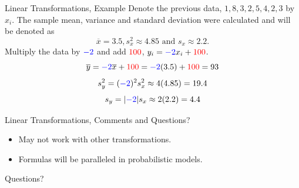 \documentclass{beamer}
\newcommand{\blue}[1]{{\color{blue} #1}}
\newcommand{\red}[1]{{\color{red} #1}}
\newcommand{\qtns}[0]{\begin{center} Questions? \end{center}}
\begin{document}
\begin{frame}{Linear Transformations, Example}
    Denote the previous data, $1,8,3,2,5,4,2,3$ by $x_i$. The sample mean, variance and standard deviation were calculated and will be denoted as \[\overline{x} = 3.5, s_x^2 \approx 4.85 \mbox{ and } s_x \approx 2.2.\]
    Multiply the data by $\blue{-2}$ and add $\red{100}$, $y_i = \blue{-2}x_i +\red{100}$.
    \[\overline{y} = \blue{-2}\overline{x} + \red{100} = \blue{-2}(3.5) + \red{100} = 93\]
    \[s_y^2 = (\blue{-2})^2 s_x^2 \approx 4(4.85) = 19.4\]
    \[s_y = |\blue{-2}| s_x \approx 2(2.2) = 4.4\]
\end{frame}

\begin{frame}{Linear Transformations, Comments and Questions?}
    \begin{itemize}
        \item May not work with other transformations.
        \item Formulas will be paralleled in probabilistic models.
    \end{itemize}
    \qtns
\end{frame}
\end{document}
